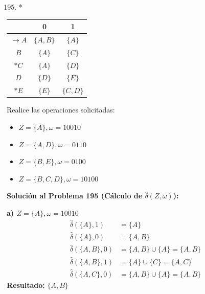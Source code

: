 \documentclass[12pt]{article}
\begin{document}
\begin{center}
\newpage

\vspace{0.5cm}
\begin{enumerate}
\setcounter{enumi}{194}
\item*
\end{enumerate}

\begin{center}
    \begin{tabular}{c|cc}
         & 0 & 1 \\
        \hline
        $\rightarrow A$ & $\{A, B\}$ & $\{A\}$ \\
        $B$ & $\{A\}$ & $\{C\}$ \\
        $*C$ & $\{A\}$ & $\{D\}$ \\
        $D$ & $\{D\}$ & $\{E\}$ \\
        $*E$ & $\{E\}$ & $\{C, D\}$ \\
    \end{tabular}
\end{center}

\vspace{0.3cm}
Realice las operaciones solicitadas:
\begin{itemize}
    \item[a)] $Z = \{A\}, \omega = 10010$
    \item[b)] $Z = \{A, D\}, \omega = 0110$
    \item[c)] $Z = \{B, E\}, \omega = 0100$
    \item[d)] $Z = \{B, C, D\}, \omega = 10100$
\end{itemize}


\begin{center}
\begin{minipage}{0.45\textwidth}
\textbf{Solución al Problema 195 (Cálculo de $\hat{\delta}(Z,\omega)$):}

\vspace{0.2cm}
\textbf{a) $Z = \{A\}, \omega = 10010$}
\begin{align*}
    \hat{\delta}(\{A\}, 1) &= \{A\} \\
    \hat{\delta}(\{A\}, 0) &= \{A, B\} \\
    \hat{\delta}(\{A, B\}, 0) &= \{A, B\} \cup \{A\} = \{A, B\} \\
    \hat{\delta}(\{A, B\}, 1) &= \{A\} \cup \{C\} = \{A, C\} \\
    \hat{\delta}(\{A, C\}, 0) &= \{A, B\} \cup \{A\} = \{A, B\}
\end{align*}
\textbf{Resultado:} $\{A, B\}$


\end{minipage}
\end{center}
\end{center}
\end{document}
